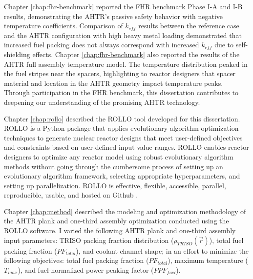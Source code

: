 Chapter \ref{chap:fhr-benchmark} reported the \gls{FHR} benchmark Phase I-A and I-B 
results, demonstrating the \gls{AHTR}'s passive safety behavior with 
negative temperature coefficients. 
Comparison of $k_{eff}$ results between the reference case and the \gls{AHTR} 
configuration with high heavy metal loading demonstrated that increased fuel 
packing does not always correspond with increased $k_{eff}$ due to self-shielding 
effects.
Chapter \ref{chap:fhr-benchmark} also reported the results of the \gls{AHTR} full 
assembly temperature model. The temperature distribution peaked in the fuel stripes near 
the spacers, highlighting to reactor designers that spacer material and location in the 
\gls{AHTR} geometry impact temperature peaks.  
Through participation in the \gls{FHR} benchmark, this dissertation contributes to 
deepening our understanding of the promising \gls{AHTR} technology. 

Chapter \ref{chap:rollo} described the \gls{ROLLO} tool developed for this 
dissertation. 
\gls{ROLLO} is a Python package that applies evolutionary algorithm 
optimization techniques to generate nuclear reactor designs that meet user-defined 
objectives and constraints based on user-defined input value ranges. 
\gls{ROLLO} enables reactor designers to optimize any reactor model using robust 
evolutionary algorithm methods without going through the cumbersome process of setting up 
an evolutionary algorithm framework, selecting appropriate hyperparameters, and 
setting up parallelization.
\gls{ROLLO} is effective, flexible, accessible, parallel, reproducible, usable, and 
hosted on Github \cite{chee_rollo_2021}. 

Chapter \ref{chap:method} described the modeling and optimization methodology of the 
\gls{AHTR} plank and one-third assembly optimization conducted using the \gls{ROLLO} 
software.
I varied the following \gls{AHTR} plank and one-third assembly input parameters: 
\gls{TRISO} packing fraction distribution ($\rho_{TRISO}(\vec{r})$), total fuel 
packing fraction ($PF_{total}$), and coolant channel shape; in an effort to minimize 
the following objectives: total fuel packing fraction ($PF_{total}$), maximum 
temperature ($T_{max}$), and fuel-normalized power peaking factor ($PPF_{fuel}$). 

